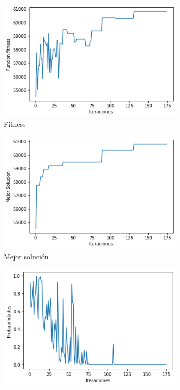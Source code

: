 \documentclass[a4paper,12pt]{article}
\begin{document}
	\begin{figure}[H]
		\centering
		\begin{subfigure}{0.24\textwidth}
			\centering
			\includegraphics[width=\textwidth]{include/L1/fitness.png}
			\caption{Fitness}
		\end{subfigure}
		\hfill
		\begin{subfigure}{0.24\textwidth}
			\centering
			\includegraphics[width=\textwidth]{include/L1/mejor_solucion.png}
			\caption{Mejor solución}
		\end{subfigure}
		\hfill
		\begin{subfigure}{0.24\textwidth}
			\centering
			\includegraphics[width=\textwidth]{include/L1/probabilidades.png}

\end{subfigure}
\end{figure}
\end{document}
